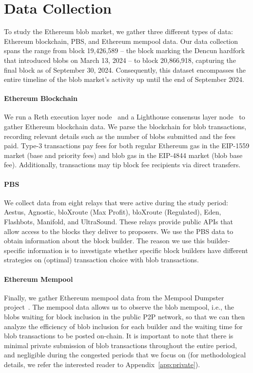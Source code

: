\section{Data Collection}\label{sec:data}
To study the Ethereum blob market, we gather three different types of data: Ethereum blockchain, PBS, and Ethereum mempool data. Our data collection spans the range from block 19,426,589 -- the block marking the Dencun hardfork that introduced blobs on March 13, 2024 -- to block 20,866,918, capturing the final block as of September 30, 2024. Consequently, this dataset encompasses the entire timeline of the blob market's activity up until the end of September 2024. %

\paragraph{Ethereum Blockchain}
We run a Reth execution layer node~\parencite{reth2024} and a Lighthouse consensus layer node~\parencite{sigmaprime2024lighthouse} to gather Ethereum blockchain data. We parse the blockchain for blob transactions, recording relevant details such as the number of blobs submitted and the fees paid. Type-3 transactions pay fees for both regular Ethereum gas in the EIP-1559 market (base and priority fees) and blob gas in the EIP-4844 market (blob base fee). Additionally, transactions may tip block fee recipients via direct transfers.

\paragraph{PBS}
We collect data from eight relays that were active during the study period: Aestus, Agnostic, bloXroute (Max Profit), bloXroute (Regulated), Eden, Flashbots, Manifold, and UltraSound. These relays provide public APIs that allow access to the blocks they deliver to proposers. We use the PBS data to obtain information about the block builder. The reason we use this builder-specific information is to investigate whether specific block builders have different strategies on (optimal) transaction choice with blob transactions.

\paragraph{Ethereum Mempool}
Finally, we gather Ethereum mempool data from the Mempool Dumpster project~\parencite{flashbots2024mempool}. The mempool data allows us to observe the blob mempool, i.e., the blobs waiting for block inclusion in the public P2P network, so that we can then analyze the efficiency of blob inclusion for each builder and the waiting time for blob transactions to be posted on-chain.
It is important to note that there is minimal private submission of blob transactions throughout the entire period, and negligible during the congested periods that we focus on (for methodological details, we refer the interested reader to Appendix~\ref{app:private}).



